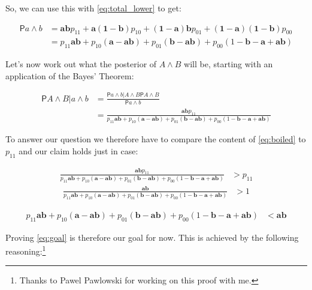 \documentclass[10pt,dvipsnames,enabledeprecatedfontcommands]{scrartcl}
\newcommand{\et}{\wedge}
\newcommand{\pr}{\mathsf{P}}
\begin{document}
\noindent So, we can use this with \eqref{eq:total_lower} to get:

\begin{align}\label{eq:aetb}
\pr{a\et b} & =  \mathbf{ab}p_{11} + \mathbf{a(1-b)}p_{10}+\mathbf{(1-a)b}p_{01} + \mathbf{(1-a)(1-b)}p_{00}\\ \nonumber
& = p_{11}\mathbf{ab} + p_{10}(\mathbf{a}-\mathbf{ab}) + p_{01}(\mathbf{b}-\mathbf{ab})+p_{00}(1-\mathbf{b}-\mathbf{a}+\mathbf{ab})
\end{align}

Let's now work out what the posterior of \(A\et B\) will be, starting
with an application of the Bayes' Theorem:

\begin{align} \nonumber
\pr{A\et B \vert a\et b} & = \frac{\pr{a\et b \vert A \et B}\pr{A\et B}}{\pr{a\et b}}
\\ \label{eq:boiled}
& = \frac{\mathbf{ab}p_{11}}{p_{11}\mathbf{ab} + p_{10}(\mathbf{a}-\mathbf{ab}) + p_{01}(\mathbf{b}-\mathbf{ab})+p_{00}(1-\mathbf{b}-\mathbf{a}+\mathbf{ab})}
\end{align}

To answer our question we therefore have to compare the content of
\eqref{eq:boiled} to \(p_{11}\) and our claim holds just in case:

\begin{align*}
\frac{\mathbf{ab}p_{11}}{p_{11}\mathbf{ab} + p_{10}(\mathbf{a}-\mathbf{ab}) + p_{01}(\mathbf{b}-\mathbf{ab})+p_{00}(1-\mathbf{b}-\mathbf{a}+\mathbf{ab})} &> p_{11}
\end{align*}\begin{align*}
 \frac{\mathbf{ab}}{p_{11}\mathbf{ab} + p_{10}(\mathbf{a}-\mathbf{ab}) + p_{01}(\mathbf{b}-\mathbf{ab})+p_{00}(1-\mathbf{b}-\mathbf{a}+\mathbf{ab})} & > 1\end{align*}

\begin{align}  
 \label{eq:goal}
p_{11}\mathbf{ab} + p_{10}(\mathbf{a}-\mathbf{ab}) + p_{01}(\mathbf{b}-\mathbf{ab})+p_{00}(1-\mathbf{b}-\mathbf{a}+\mathbf{ab}) & < \mathbf{ab}
\end{align}

Proving \eqref{eq:goal} is therefore our goal for now. This is achieved
by the following
reasoning:\footnote{Thanks to Pawel Pawlowski for working on this proof with me.}
\end{document}
